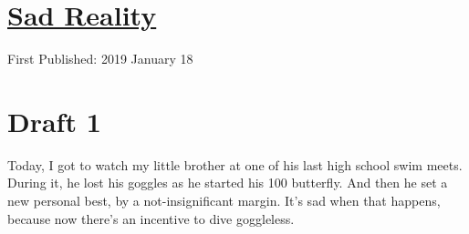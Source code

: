 \documentclass[12pt]{article}[titlepage]
\newcommand{\1}{\={a}}
\newcommand{\2}{\={e}}
\newcommand{\3}{\={\i}}
\newcommand{\4}{\=o}
\newcommand{\5}{\=u}
\newcommand{\6}{\={A}}
\renewcommand{\,}{\textsuperscript{,}}
\begin{document}
\doublespacing
\section{\href{sad-reality.html}{Sad Reality}}
First Published: 2019 January 18
\section{Draft 1}
Today, I got to watch my little brother at one of his last high school swim meets.
During it, he lost his goggles as he started his 100 butterfly.
And then he set a new personal best, by a not-insignificant margin.
It's sad when that happens, because now there's an incentive to dive goggleless.
\end{document}
